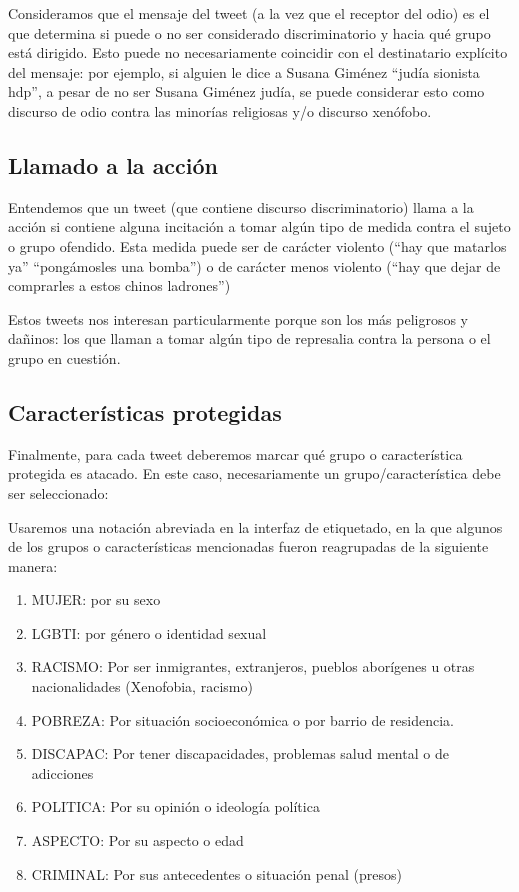 Consideramos que el mensaje del tweet (a la vez que el receptor del odio) es el que determina si puede o no ser considerado discriminatorio y hacia qué grupo está dirigido. Esto puede no necesariamente coincidir con el destinatario explícito del mensaje: por ejemplo, si alguien le dice a Susana Giménez ``judía sionista hdp'', a pesar de no ser Susana Giménez judía, se puede considerar esto como discurso de odio contra las minorías religiosas y/o discurso xenófobo.


\subsection{Llamado a la acción}

Entendemos que un tweet (que contiene discurso discriminatorio) llama a la acción si contiene alguna incitación a tomar algún tipo de medida contra el sujeto o grupo ofendido. Esta medida puede ser de carácter violento (``hay que matarlos ya'' ``pongámosles una bomba'') o de carácter menos violento (``hay que dejar de comprarles a estos chinos ladrones'')

Estos tweets nos interesan particularmente porque son los más peligrosos y dañinos: los que llaman a tomar algún tipo de represalia contra la persona o el grupo en cuestión.

\subsection{Características protegidas}

Finalmente, para cada tweet deberemos marcar qué grupo o característica protegida es atacado. En este caso, necesariamente un grupo/característica debe ser seleccionado:

Usaremos una notación abreviada en la interfaz de etiquetado, en la que algunos de los grupos o características mencionadas fueron reagrupadas de la siguiente manera:

\begin{enumerate}
    \item MUJER: por su sexo
    \item LGBTI: por género o identidad sexual
    \item RACISMO: Por ser inmigrantes, extranjeros, pueblos aborígenes u otras nacionalidades (Xenofobia, racismo)
    \item POBREZA: Por situación socioeconómica o por barrio de residencia.
    \item DISCAPAC: Por tener discapacidades, problemas salud mental o de adicciones
    \item POLITICA: Por su opinión o ideología política
    \item ASPECTO: Por su aspecto o edad
    \item CRIMINAL: Por sus antecedentes o situación penal (presos)
\end{enumerate}


